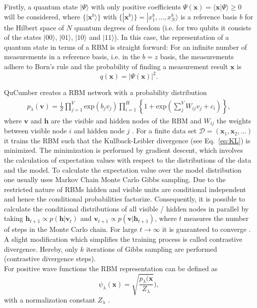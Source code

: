 \documentclass[pra,aps,showpacs,groupedaddress,superscriptaddress,twocolumn,toc=flat,biblatex,footinbib]{revtex4-1}
\newcommand{\ket}[1]{|#1\rangle}
\renewcommand{\vec}[1]{\bm{#1}}
\begin{document}
Firstly, a quantum state $\ket{\Psi}$ with only positive coefficients $\Psi(\vec{x}) = \langle\vec{x} \vert \Psi \rangle \geq 0$ will be considered, where 
$\{\ket{\vec{x}^b}\}$ with $\{\ket{\vec{x}^b}\} = \ket{x_1^b, \dots , x_N^b}$ is a reference basis $b$ for the Hilbert space of $N$ quantum degrees of freedom (i.e. for two qubits it consists of the states $\ket{00}$, $\ket{01}$, $\ket{10}$ and $\ket{11}$). In this case, the representation of a quantum state in terms of a RBM is straight forward: For an infinite number of measurements in a reference basis, i.e. in the $b = z$ basis, the measurements adhere to Born's rule and the probability of finding a measurement result $\vec{x}$ is 
$$
q(\vec{x})=\vert \Psi (\vec{x})\vert^2.$$

QuCumber creates a RBM network with a probability distribution \begin{align}
p_\lambda (\vec{v}) =\frac{1}{Z}\prod_{j=1}^{V}\mathrm{exp}\left( b_j v_j\right) \prod_{i=1}^{H} \left\{ 1 + \mathrm{exp}\left( \sum_j^V W_{ij} v_j +c_i \right)\right\},
\label{eq:RBM_prob2}
\end{align} 
where $\vec{v}$ and $\vec{h}$ are the visible and hidden nodes of the RBM and $W_{ij}$ the weights between visible node $i$ and hidden node $j$ \cite{Goodfellow}. For a finite data set $\mathcal{D}= (\vec{x}_1, \vec{x}_2, \dots)$ it trains the RBM
such that the Kullback-Leibler divergence (see Eq.~\eqref{eq:KL})
is minimized. The minimization is performed by gradient descent, which involves the calculation of expectation values with respect to the distributions of the data and the model. To calculate the expectation value over the model distribution one usually uses Markov Chain Monte Carlo Gibbs sampling. Due to the restricted nature of RBMs hidden and visible units are conditional independent and hence the conditional probabilities factorize. Consequently, it is possible to calculate the conditional distributions of all visible / hidden nodes in parallel by taking $\vec{h}_{t+1} \propto p(\vec{h}\vert \vec{v}_t)$ and $\vec{v}_{t+1} \propto p(\vec{v}\vert \vec{h}_{t+1})$, where $t$ measures the number of steps in the Monte Carlo chain. For large $t\to \infty$ it is guaranteed to converge \cite{Mehta2019}. A slight modification which simplifies the training process is called contrastive divergence. Hereby, only $k$ iterations of Gibbs sampling are performed (contrastive divergence steps).\\


For positive wave functions the RBM representation can be defined as
$$
\psi_\lambda(\vec{x}) = \sqrt{\frac{p_\lambda(\vec{x}}{Z_\lambda}}),
$$
with a normalization constant $Z_\lambda$ \cite{Qucumber2019}. 
\end{document}

